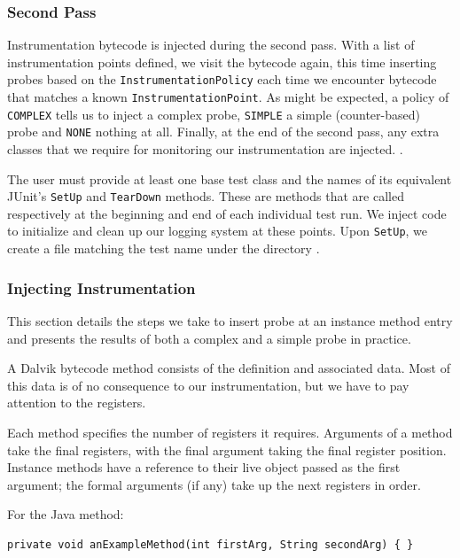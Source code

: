 \subsubsection{Second Pass}

Instrumentation bytecode is injected during the second pass. With a list of instrumentation points defined, we visit the bytecode again, this time inserting probes based on the {\tt InstrumentationPolicy} each time we encounter bytecode that matches a known {\tt InstrumentationPoint}. As might be expected, a policy of {\tt COMPLEX} tells us to inject a complex probe, {\tt SIMPLE} a simple (counter-based) probe and {\tt NONE} nothing at all. Finally, at the end of the second pass, any extra classes that we require for monitoring our instrumentation are injected. .

The user must provide at least one base test class and the names of its equivalent JUnit's {\tt SetUp} and {\tt TearDown} methods. These are methods that are called respectively at the beginning and end of each individual test run. We inject code to initialize and clean up our logging system at these points. Upon {\tt SetUp}, we create a file matching the test name  under the directory .

\subsubsection{Injecting Instrumentation}

This section details the steps we take to insert probe at an instance method entry and presents the results of both a complex and a simple probe in practice.

A Dalvik bytecode method consists of the definition and associated data. Most of this data is of no consequence to our instrumentation, but we have to pay attention to the registers.

Each method specifies the number of registers it requires. Arguments of a method take the final registers, with the final argument taking the final register position. Instance methods have a reference to their live object passed as the first argument; the formal arguments (if any) take up the next registers in order.

For the Java method:

\begin{lstlisting}
private void anExampleMethod(int firstArg, String secondArg) { }
\end{lstlisting}

